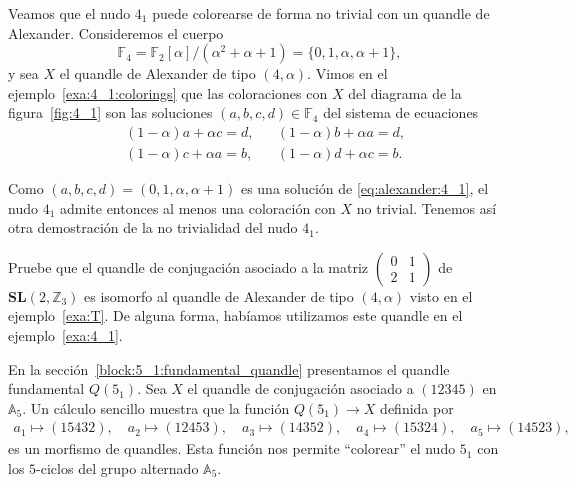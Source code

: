 \documentclass[graybox]{svmult}
\newcommand{\Z}{\mathbb{Z}}
\newcommand{\F}{\mathbb{F}}
\newcommand{\SL}{\mathbf{SL}}
\newcommand{\Alt}{\mathbb{A}}
\begin{document}
\begin{example}
    \label{exa:T}
    Veamos que el nudo $4_1$ puede colorearse de forma no trivial con un
    quandle de Alexander.  Consideremos el cuerpo
    \[
        \F_4=\F_2[\alpha]/(\alpha^2+\alpha+1)=\{0,1,\alpha,\alpha+1\},
    \]
    y sea $X$ el quandle de Alexander de tipo $(4,\alpha)$. Vimos en el
    ejemplo~\ref{exa:4_1:colorings} que las coloraciones con $X$ del diagrama de la
    figura~\ref{fig:4_1} son las soluciones $(a,b,c,d)\in\F_4$ del sistema de
    ecuaciones 
    \begin{equation}
        \label{eq:alexander:4_1}
        \begin{aligned}
            & (1-\alpha)a+\alpha c=d, && (1-\alpha)b+\alpha a=d,\\
            & (1-\alpha)c+\alpha a=b, && (1-\alpha)d+\alpha c=b.
        \end{aligned}
    \end{equation}

    Como $(a,b,c,d)=(0,1,\alpha,\alpha+1)$ es una solución de
    \eqref{eq:alexander:4_1}, el nudo $4_1$ admite entonces al menos una coloración 
    con $X$ no trivial.  Tenemos así otra demostración de la no trivialidad del
    nudo $4_1$. 
\end{example}


\begin{exercise}
	Pruebe que el quandle de conjugación asociado a la matriz $\begin{pmatrix}0
	& 1\\ 2 & 1\end{pmatrix}$ de $\SL(2,\Z_3)$ es isomorfo al quandle de
	Alexander de tipo $(4,\alpha)$ visto en el ejemplo~\ref{exa:T}.  De alguna
	forma, habíamos utilizamos este quandle en el ejemplo~\ref{exa:4_1}.
\end{exercise}

\begin{example}
	En la sección~\ref{block:5_1:fundamental_quandle} presentamos el quandle
	fundamental $Q(5_1)$.  Sea $X$ el quandle de conjugación asociado a
	$(12345)$ en $\Alt_5$.  Un cálculo sencillo muestra que la función
	$Q(5_1)\to X$ definida por 
	\begin{multline*}
        a_1\mapsto (15432),\quad
        a_2\mapsto (12453),\quad
        a_3\mapsto (14352),\quad 
        a_4\mapsto (15324),\quad
        a_5\mapsto (14523),
	\end{multline*}
	es un morfismo de quandles. Esta función nos permite ``colorear'' el nudo
	$5_1$ con los $5$-ciclos del grupo alternado $\Alt_5$.
\end{example}
\end{document}
